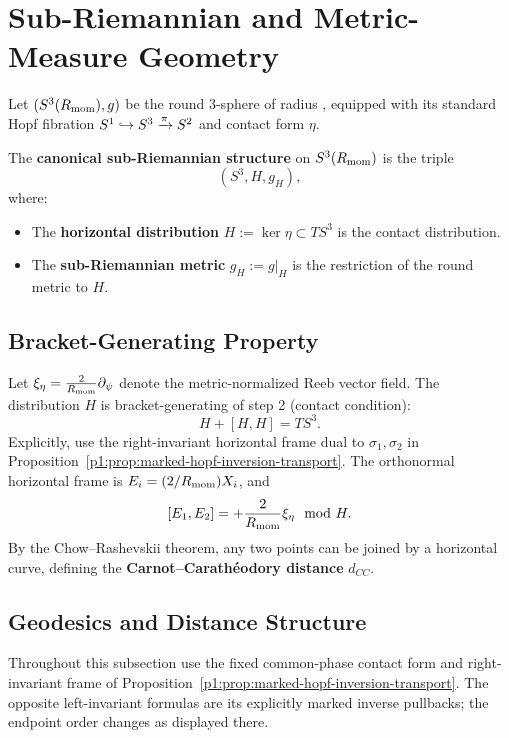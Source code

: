 \documentclass[11pt]{article}
\begin{document}
\section{Sub-Riemannian and Metric-Measure Geometry}
\label{p1:sec:sub-riemannian}

Let $(S^3(R_{\mathrm{mom}}), g)$ be the round 3-sphere of radius \Rmom, equipped with its standard Hopf fibration
$S^1 \hookrightarrow S^3 \xrightarrow{\pi} S^2$ and contact form $\eta$.

\begin{definition}
The \textbf{canonical sub-Riemannian structure} on \(S^3(R_{\mathrm{mom}})\) is
the triple
\[
(S^3,H,g_H),
\]
where:
\begin{itemize}
\item The \textbf{horizontal distribution} \(H := \ker \eta \subset TS^3\)
is the contact distribution.
\item The \textbf{sub-Riemannian metric} \(g_H := g|_H\) is the restriction
of the round metric to \(H\).
\end{itemize}
\end{definition}

\subsection{Bracket-Generating Property}

Let $\xi_\eta = \frac{2}{R_{\mathrm{mom}}}\partial_\psi$ denote the metric-normalized Reeb vector field. The distribution $H$ is bracket-generating of step 2 (contact condition):
\[
H + [H, H] = TS^3.
\]
Explicitly, use the right-invariant horizontal frame dual to
$\sigma_1,\sigma_2$ in
Proposition~\ref{p1:prop:marked-hopf-inversion-transport}.  The orthonormal
horizontal frame is $E_i=(2/R_{\mathrm{mom}})X_i$, and
\[
[E_1,E_2]=+\frac{2}{R_{\mathrm{mom}}}\xi_\eta \mod H.
\]
By the Chow--Rashevskii theorem, any two points can be joined by a horizontal curve, defining the \textbf{Carnot--Carathéodory distance} $d_{CC}$.

\subsection{Geodesics and Distance Structure}

Throughout this subsection use the fixed common-phase contact form and
right-invariant frame of
Proposition~\ref{p1:prop:marked-hopf-inversion-transport}.  The opposite
left-invariant formulas are its explicitly marked inverse pullbacks; the
endpoint order changes as displayed there.
\end{document}
